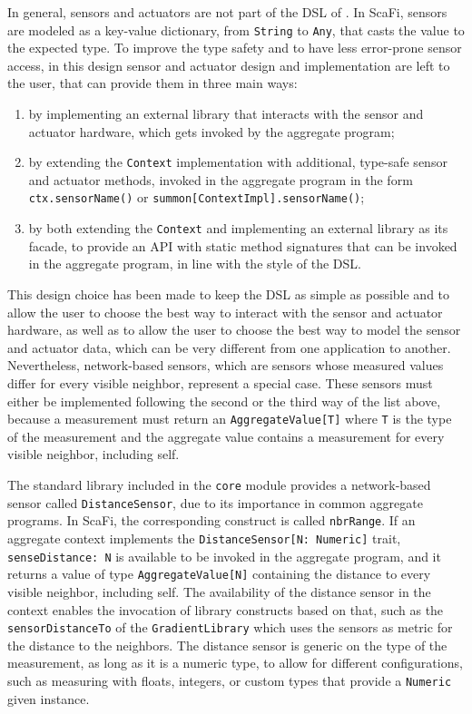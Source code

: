In general, sensors and actuators are not part of the \ac{DSL} of \this.
%
In ScaFi, sensors are modeled as a key-value dictionary, from \texttt{String} to \texttt{Any}, that casts the value to the expected type.
%
To improve the type safety and to have less error-prone sensor access, in this design sensor and actuator design and implementation are left to the user, that can provide them in three main ways:
\begin{enumerate}
    \item by implementing an external library that interacts with the sensor and actuator hardware, which gets invoked by the aggregate program;
    \item by extending the \texttt{Context} implementation with additional, type-safe sensor and actuator methods, invoked in the aggregate program in the form \texttt{ctx.sensorName()} or \texttt{summon[ContextImpl].sensorName()};
    \item by both extending the \texttt{Context} and implementing an external library as its facade, to provide an \ac{API} with static method signatures that can be invoked in the aggregate program, in line with the style of the \ac{DSL}.
\end{enumerate}
%
This design choice has been made to keep the \ac{DSL} as simple as possible and to allow the user to choose the best way to interact with the sensor and actuator hardware, as well as to allow the user to choose the best way to model the sensor and actuator data, which can be very different from one application to another.
%
Nevertheless, network-based sensors, which are sensors whose measured values differ for every visible neighbor, represent a special case.
%
These sensors must either be implemented following the second or the third way of the list above, because a measurement must return an \texttt{AggregateValue[T]} where \texttt{T} is the type of the measurement and the aggregate value contains a measurement for every visible neighbor, including self.

The standard library included in the \texttt{core} module provides a network-based sensor called \texttt{DistanceSensor}, due to its importance in common aggregate programs.
%
In ScaFi, the corresponding construct is called \texttt{nbrRange}.
%
If an aggregate context implements the \texttt{DistanceSensor[N: Numeric]} trait, \texttt{senseDistance: N} is available to be invoked in the aggregate program, and it returns a value of type \texttt{AggregateValue[N]} containing the distance to every visible neighbor, including self.
%
The availability of the distance sensor in the context enables the invocation of library constructs based on that, such as the \texttt{sensorDistanceTo} of the \texttt{GradientLibrary} which uses the sensors as metric for the distance to the neighbors.
%
The distance sensor is generic on the type of the measurement, as long as it is a numeric type, to allow for different configurations, such as measuring with floats, integers, or custom types that provide a \texttt{Numeric} given instance.

